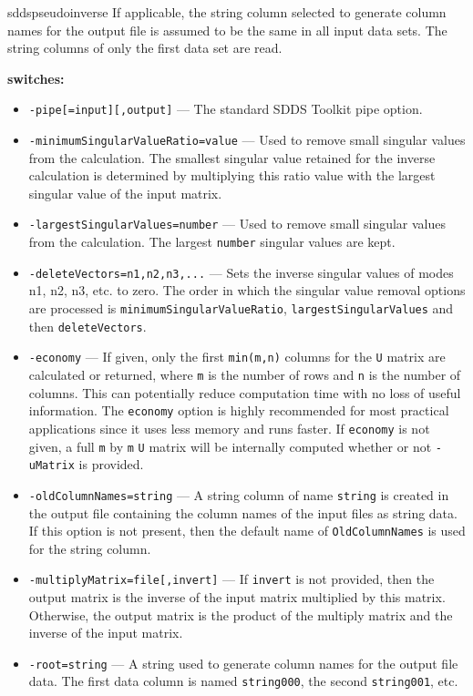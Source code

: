 \begin{sddsprog}{sddspseudoinverse}
    If applicable, the string column selected to generate column names for the output file is assumed to be the same in all input data sets. The string columns of only the first data set are read.

  \item {\bf switches:}
    \begin{itemize}
      \item \verb|-pipe[=input][,output]| --- The standard SDDS Toolkit pipe option.
      \item \verb|-minimumSingularValueRatio=value| --- Used to remove small singular values from the calculation. The smallest singular value retained for the inverse calculation is determined by multiplying this ratio value with the largest singular value of the input matrix.
      \item \verb|-largestSingularValues=number| --- Used to remove small singular values from the calculation. The largest \verb|number| singular values are kept.
      \item \verb|-deleteVectors=n1,n2,n3,...| --- Sets the inverse singular values of modes n1, n2, n3, etc. to zero. The order in which the singular value removal options are processed is \verb|minimumSingularValueRatio|, \verb|largestSingularValues| and then \verb|deleteVectors|.
      \item \verb|-economy| --- If given, only the first \verb|min(m,n)| columns for the \verb|U| matrix are calculated or returned, where \verb|m| is the number of rows and \verb|n| is the number of columns. This can potentially reduce computation time with no loss of useful information. The \verb|economy| option is highly recommended for most practical applications since it uses less memory and runs faster. If \verb|economy| is not given, a full \verb|m| by \verb|m| \verb|U| matrix will be internally computed whether or not \verb|-uMatrix| is provided.
      \item \verb|-oldColumnNames=string| --- A string column of name {\tt string} is created in the output file containing the column names of the input files as string data. If this option is not present, then the default name of \verb|OldColumnNames| is used for the string column.
      \item \verb|-multiplyMatrix=file[,invert]| --- If \verb|invert| is not provided, then the output matrix is the inverse of the input matrix multiplied by this matrix. Otherwise, the output matrix is the product of the multiply matrix and the inverse of the input matrix.
      \item \verb|-root=string| --- A string used to generate column names for the output file data. The first data column is named \verb|string000|, the second \verb|string001|, etc.

\end{itemize}
\end{sddsprog}
